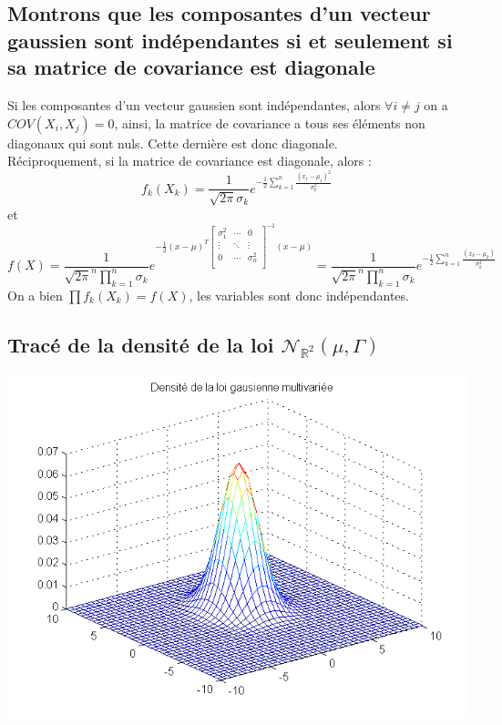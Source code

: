 \documentclass{report}
\begin{document}
		\subsection{Montrons que les composantes d'un vecteur gaussien sont indépendantes si et seulement si sa matrice de covariance est diagonale}
			Si les composantes d'un vecteur gaussien sont indépendantes, alors $\forall i \neq j$ on a $COV(X_i, X_j) = 0$, ainsi, la matrice de covariance a tous ses éléments non diagonaux qui sont nuls. Cette dernière est donc diagonale.\\
			Réciproquement, si la matrice de covariance est diagonale, alors :
			\[ f_k(X_k) = \frac{1}{\sqrt{2\pi}\sigma_k}e^{-\frac{1}{2}\sum\limits_{k=1}^{n}\frac{(x_1 - \mu_1)^2}{\sigma_k^2}} \]
			et
			\[f(X) = \frac{1}{\sqrt{2\pi}^n\prod\limits_{k=1}^{n}\sigma_k}e^{-\frac{1}{2}(x-\mu)^T\left[ 
				\begin{array}{ccc} 
					\sigma_1^2 & \cdots & 0 \\
					\vdots & \ddots & \vdots \\
					0 & \cdots & \sigma_n^2 \\
				\end{array} 
			\right]^{-1}(x-\mu)} = \frac{1}{\sqrt{2\pi}^n\prod\limits_{k=1}^{n}\sigma_k}e^{-\frac{1}{2}\sum\limits_{k=1}^{n}\frac{(x_k - \mu_k)}{\sigma_k^2}} \]
			On a bien $\prod\limits f_k(X_k) = f(X)$, les variables sont donc indépendantes.

		\subsection{Tracé de la densité de la loi $\mathcal{N}_{\mathbb{R}^2}(\mu, \Gamma)$}
			\includegraphics[scale=0.7]{sources/Q222-1.png}
\end{document}
